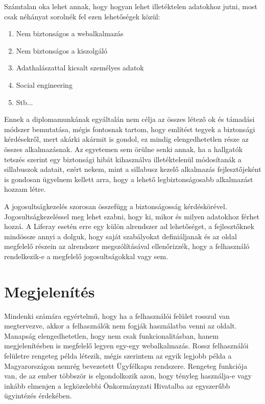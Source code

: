 \documentclass[hidelinks, 12pt, a4paper]{report}
\begin{document}
Számtalan oka lehet annak, hogy hogyan lehet illetéktelen adatokhoz jutni, most csak néhányat sorolnék fel ezen lehetőségek közül:
\begin{enumerate}
\item Nem biztonságos a webalkalmazás
\item Nem biztonságos a kiszolgáló
\item Adathalászattal kicsalt személyes adatok
\item Social engineering
\item Stb...
\end{enumerate}

Ennek a diplomamunkának egyáltalán nem célja az összes létező ok és támadási módszer bemutatása, mégis fontosnak tartom, hogy említést tegyek a biztonsági kérdésekről, mert akárki akármit is gondol, ez mindig elengedhetetlen része az összes alkalmazásnak. Az egyetemen sem örülne senki annak, ha a hallgatók tetszés szerint egy biztonsági hibát kihasználva illetéktelenül módosítanák a sillabuszok adatait, ezért nekem, mint a sillabusz kezelő alkalmazás fejlesztőjeként is gondosan ügyelnem kellett arra, hogy a lehető legbiztonságosabb alkalmazást hozzam létre.

A jogosultságkezelés szorosan összefügg a biztonságosság kérdéskörével. Jogosultságkezeléssel meg lehet szabni, hogy ki, mikor és milyen adatokhoz férhet hozzá. A Liferay esetén erre egy külön alrendszer ad lehetőséget, a fejlesztőknek mindössze annyi a dolguk, hogy saját szabályokat definiáljanak és az oldal megfelelő részein az alrendszer megszólításával ellenőrizzék, hogy a felhasználó rendelkezik-e a megfelelő jogosultságokkal vagy sem.


\section{Megjelenítés}

Mindenki számára egyértelmű, hogy ha a felhasználói felület rosszul van megtervezve, akkor a felhasználók nem fogják használatba venni az oldalt. Manapság elengedhetetlen, hogy nem csak funkcionalitásban, hanem megjelenítésben is megfelelő legyen egy-egy webalkalmazás. Rossz felhasználói felületre rengeteg példa létezik, mégis szerintem az egyik legjobb példa a Magyarországon nemrég bevezetett Ügyfélkapu rendszere. Rengeteg funkciója van, de az ember többször is elgondolkozik azon, hogy tényleg használja-e vagy inkább elmenjen a legközelebbi Önkormányzati Hivatalba az egyszerűbb ügyintézés érdekében.
\end{document}
